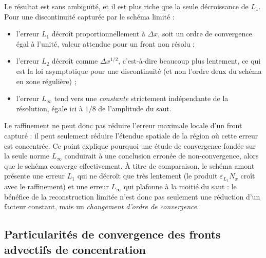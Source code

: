 \documentclass[11pt,a4paper]{report}
\begin{document}
Le résultat est sans ambiguïté, et il est plus riche que la seule décroissance de \(L_1\). Pour une
discontinuité capturée par le schéma limité :
\begin{itemize}
  \item l'erreur \(L_1\) décroît proportionnellement à \(\Delta x\), soit un ordre de convergence égal à
        l'unité, valeur attendue pour un front non résolu ;
  \item l'erreur \(L_2\) décroît comme \(\Delta x^{1/2}\), c'est-à-dire beaucoup plus lentement, ce qui est
        la loi asymptotique pour une discontinuité (et non l'ordre deux du schéma en zone régulière) ;
  \item l'erreur \(L_\infty\) tend vers une \emph{constante} strictement indépendante de la résolution,
        égale ici à \(1/8\) de l'amplitude du saut.
\end{itemize}
Le raffinement ne peut donc pas réduire l'erreur maximale locale d'un front capturé : il peut seulement
réduire l'étendue spatiale de la région où cette erreur est concentrée. Ce point explique pourquoi une
étude de convergence fondée sur la seule norme \(L_\infty\) conduirait à une conclusion erronée de
non-convergence, alors que le schéma converge effectivement. À titre de comparaison, le schéma amont
présente une erreur \(L_1\) qui ne décroît que très lentement (le produit \(\varepsilon_{L_1}N_x\) croît
avec le raffinement) et une erreur \(L_\infty\) qui plafonne à la moitié du saut : le bénéfice de la
reconstruction limitée n'est donc pas seulement une réduction d'un facteur constant, mais un
\emph{changement d'ordre de convergence}.

\subsection{Particularités de convergence des fronts advectifs de concentration}
\label{sec:fronts-convergence}
\end{document}

